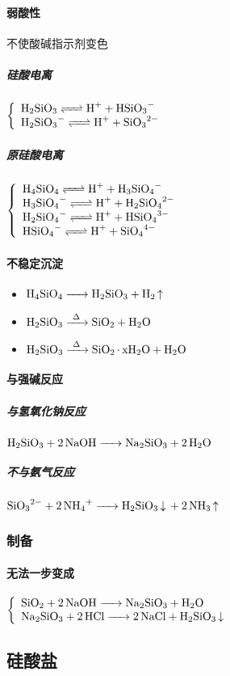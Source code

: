 \documentclass[a4paper]{article}
\begin{document}
	\paragraph{弱酸性}
	不使酸碱指示剂变色
	\subparagraph{硅酸电离}
	$\left\{\begin{array}{lr}
		\ce{H2SiO3 <=> H+ + HSiO3-}\\
		\ce{H2SiO3- <=> H+ + SiO3^2-}\\
	\end{array}\right.$
	\subparagraph{原硅酸电离}
	$\left\{\begin{array}{lr}
		\ce{H4SiO4 <=> H+ + H3SiO4-}\\
		\ce{H3SiO4- <=> H+ + H2SiO4^2-}\\
		\ce{H2SiO4- <=> H+ + HSiO4^3-}\\
		\ce{HSiO4- <=> H+ + SiO4^4-}\\
	\end{array}\right.$
	\paragraph{不稳定沉淀}
	\begin{itemize}
		\item $\ce{H4SiO4 -> H2SiO3 + H2 ^}$
		\item $\ce{H2SiO3 ->[\Delta] SiO2 + H2O}$
		\item $\ce{H2SiO3 ->[\Delta] SiO2*xH2O + H2O}$
	\end{itemize}
	\paragraph{与强碱反应}
	\subparagraph{与氢氧化钠反应}
	$\ce{H2SiO3 + 2NaOH -> Na2SiO3 + 2H2O}$
	\subparagraph{不与氨气反应}
	$\ce{SiO3^2- + 2NH4+ -> H2SiO3 v + 2NH3 ^}$
	\subsubsection{制备}
	\paragraph{无法一步变成}
	$\left\{\begin{array}{lr}
		\ce{SiO2 + 2NaOH -> Na2SiO3 + H2O}\\
		\ce{Na2SiO3 + 2HCl -> 2NaCl + H2SiO3 v}\\
	\end{array}\right.$
	
	\subsection{硅酸盐}
\end{document}
